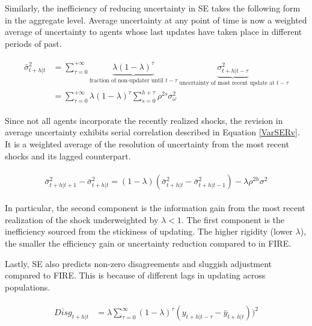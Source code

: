 \documentclass[12pt]{article}
\begin{document}
	Similarly, the inefficiency of reducing uncertainty in SE takes the following form in the aggregate level. Average uncertainty at any point of time is now a weighted average of uncertainty to agents whose last updates have taken place in different periods of past. 
	
	
	\begin{eqnarray}\label{VarSEPop}
		\begin{aligned}
			\bar \sigma^2_{t+h|t} & = \sum^{+\infty}_{\tau =0} \underbrace{\lambda (1-\lambda)^\tau}_{\text{fraction of non-updater until }t-\tau} \underbrace{\sigma^2_{t+h|t-\tau}}_{\text{ uncertainty of most recent update at }t-\tau} \\
			& = \sum^{+\infty}_{\tau =0} \lambda (1-\lambda)^\tau \sum^{h+\tau}_{s=0}\rho^{2s} \sigma^2_{\omega}
		\end{aligned}
	\end{eqnarray}
	
	
	Since not all agents incorporate the recently realized shocks, the revision in average uncertainty exhibits serial correlation described in Equation \ref{VarSERv}. It is a weighted average of the resolution of uncertainty from the most recent shocks and its lagged counterpart. 
	
	\begin{eqnarray}\label{VarSERv}
		\begin{aligned}
			\bar \sigma^2_{t+h|t+1} - \bar \sigma^2_{t+h|t} = (1-\lambda)(
			\bar \sigma^2_{t+h|t} - \bar \sigma^2_{t+h|t-1}) -\lambda \rho^{2h} \sigma^2 
		\end{aligned}
	\end{eqnarray}
	
	In particular, the second component is the information gain from the most recent realization of the shock underweighted by $\lambda<1$. The first component is the inefficiency sourced from the stickiness of updating. The higher rigidity (lower $\lambda$), the smaller the efficiency gain or uncertainty reduction compared to in FIRE. 
	
	Lastly, SE also predicts non-zero disagreements and sluggish adjustment compared to FIRE. This is because of different lags in updating across populations. 
	
	\begin{eqnarray}\label{DisgSEPop}
		\begin{aligned}
			\overline{Disg}_{t+h|t} & = \lambda \sum^{\infty}_{\tau=0} (1-\lambda)^{\tau} (y_{t+h|t-\tau} - \bar y_{t+h|t }))^2  
		\end{aligned}
	\end{eqnarray}
	
\end{document}
